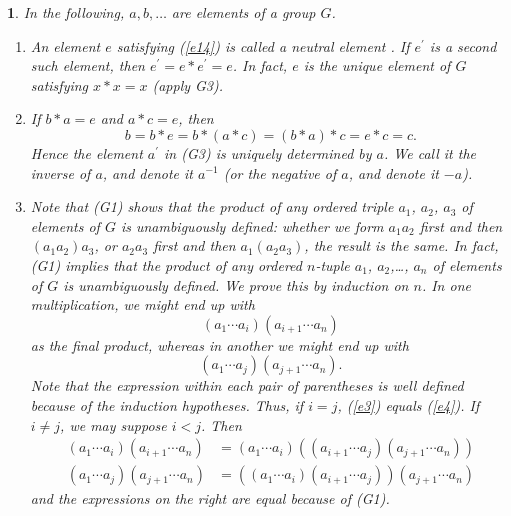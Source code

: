 \documentclass[a4paper,11pt,final]{memoir}%
\newtheorem{plain}[X]{}
\theoremstyle{nonumberplain}
\begin{document}
\begin{plain}
\label{bd2}In the following, $a,b,\ldots$ are elements of a group $G$.

\begin{enumerate}
\item An element $e$ satisfying (\ref{e14}) is called a \emph{neutral element}%
%
. If $e^{\prime}$ is a second such element, then $e^{\prime}=e\ast e^{\prime
}=e$. In fact, $e$ is the unique element of $G$ satisfying $x\ast x=x$ (apply G3).

\item If $b\ast a=e$ and $a\ast c=e$, then
\[
b=b\ast e=b\ast(a\ast c)=(b\ast a)\ast c=e\ast c=c.
\]
Hence the element $a^{\prime}$ in (G3) is uniquely determined by $a$. We call
it the \emph{inverse\/}%
of $a$, and denote it $a^{-1}$ (or the \emph{negative\/}%
of $a$, and denote it $-a$).

\item Note that (G1) shows that the product of any ordered triple $a_{1}$,
$a_{2}$, $a_{3}$ of elements of $G$ is unambiguously defined: whether we form
$a_{1}a_{2}$ first and then $(a_{1}a_{2})a_{3}$, or $a_{2}a_{3}$ first and
then $a_{1}(a_{2}a_{3})$, the result is the same. In fact, (G1) implies that
the product of any ordered $n$-tuple $a_{1}$, $a_{2}$,\ldots, $a_{n}$ of
elements of $G$ is unambiguously defined. We prove this by induction on $n$.
In one multiplication, we might end up with%
\begin{equation}
(a_{1}\cdots a_{i})(a_{i+1}\cdots a_{n}) \label{e3}%
\end{equation}
as the final product, whereas in another we might end up with%
\begin{equation}
(a_{1}\cdots a_{j})(a_{j+1}\cdots a_{n}). \label{e4}%
\end{equation}
Note that the expression within each pair of parentheses is well defined
because of the induction hypotheses. Thus, if $i=j$, (\ref{e3}) equals
(\ref{e4}). If $i\neq j$, we may suppose $i<j$. Then%
\begin{align*}
(a_{1}\cdots a_{i})(a_{i+1}\cdots a_{n})  &  =(a_{1}\cdots a_{i})\left(
(a_{i+1}\cdots a_{j})(a_{j+1}\cdots a_{n})\right) \\
(a_{1}\cdots a_{j})(a_{j+1}\cdots a_{n})  &  =\left(  (a_{1}\cdots
a_{i})(a_{i+1}\cdots a_{j})\right)  (a_{j+1}\cdots a_{n})
\end{align*}
and the expressions on the right are equal because of (G1).


\end{enumerate}
\end{plain}
\end{document}
